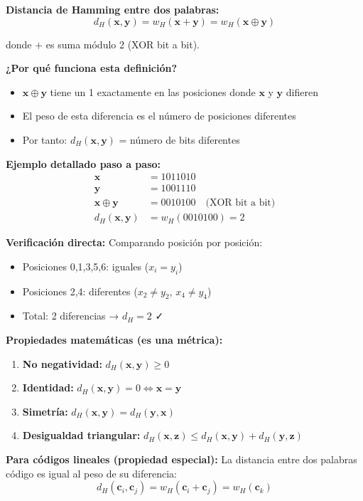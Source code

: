 \documentclass[10pt,a4paper]{article}
\begin{document}
\textbf{Distancia de Hamming entre dos palabras:}
$$\boxed{d_H(\mathbf{x},\mathbf{y}) = w_H(\mathbf{x} + \mathbf{y}) = w_H(\mathbf{x} \oplus \mathbf{y})}$$

donde $+$ es suma módulo 2 (XOR bit a bit).

\textbf{¿Por qué funciona esta definición?}
\begin{itemize}
\item $\mathbf{x} \oplus \mathbf{y}$ tiene un 1 exactamente en las posiciones donde $\mathbf{x}$ y $\mathbf{y}$ difieren
\item El peso de esta diferencia es el número de posiciones diferentes
\item Por tanto: $d_H(\mathbf{x},\mathbf{y})$ = número de bits diferentes
\end{itemize}

\textbf{Ejemplo detallado paso a paso:}
\begin{align*}
\mathbf{x} &= 1011010 \\
\mathbf{y} &= 1001110 \\
\hline
\mathbf{x} \oplus \mathbf{y} &= 0010100 \quad \text{(XOR bit a bit)}\\
d_H(\mathbf{x},\mathbf{y}) &= w_H(0010100) = 2
\end{align*}

\textbf{Verificación directa:} Comparando posición por posición:
\begin{itemize}
\item Posiciones 0,1,3,5,6: iguales ($x_i = y_i$)
\item Posiciones 2,4: diferentes ($x_2 \neq y_2$, $x_4 \neq y_4$)
\item Total: 2 diferencias → $d_H = 2$ ✓
\end{itemize}

\textbf{Propiedades matemáticas (es una métrica):}
\begin{enumerate}
\item \textbf{No negatividad:} $d_H(\mathbf{x},\mathbf{y}) \geq 0$
\item \textbf{Identidad:} $d_H(\mathbf{x},\mathbf{y}) = 0 \Leftrightarrow \mathbf{x} = \mathbf{y}$
\item \textbf{Simetría:} $d_H(\mathbf{x},\mathbf{y}) = d_H(\mathbf{y},\mathbf{x})$
\item \textbf{Desigualdad triangular:} $d_H(\mathbf{x},\mathbf{z}) \leq d_H(\mathbf{x},\mathbf{y}) + d_H(\mathbf{y},\mathbf{z})$
\end{enumerate}

\textbf{Para códigos lineales (propiedad especial):}
La distancia entre dos palabras código es igual al peso de su diferencia:
$$d_H(\mathbf{c}_i, \mathbf{c}_j) = w_H(\mathbf{c}_i + \mathbf{c}_j) = w_H(\mathbf{c}_k)$$
\end{document}

